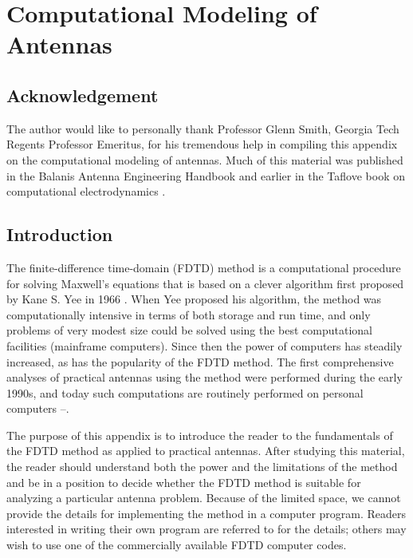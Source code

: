 \chapter{Computational Modeling of Antennas}

\section{Acknowledgement}
The author would like to personally thank Professor Glenn Smith, Georgia Tech Regents Professor Emeritus, for his tremendous help in compiling this appendix on the computational modeling of antennas.  Much of this material was published in the Balanis Antenna Engineering Handbook \cite{BalanisHB} and earlier in the Taflove book on computational electrodynamics \cite{MaloneySmithAntChapters}.

\section{Introduction}
The finite-difference time-domain (FDTD) method is a computational procedure for solving Maxwell's equations that is based on a clever algorithm first proposed by Kane S. Yee in 1966 \cite{Yee66}.  When Yee proposed his algorithm, the method was computationally intensive in terms of both storage and run time, and only problems of very modest size could be solved using the best computational facilities (mainframe computers).  Since then the power of computers has steadily increased, as has the popularity of the FDTD method.  The first comprehensive analyses of practical antennas using the method were performed during the early 1990s, and today such computations are routinely performed on personal computers \cite{Maloney1}--\cite{LuebbersGain}.

The purpose of this appendix is to introduce the reader to the fundamentals of the FDTD method as applied to practical antennas.  After studying this material, the reader should understand both the power and the limitations of the method and be in a position to decide whether the FDTD method is suitable for analyzing a particular antenna problem.  Because of the limited space, we cannot provide the details for implementing the method in a computer program.  Readers interested in writing their own program are referred to \cite{MaloneySmithAntChapters} for the details; others may wish to use one of the commercially available FDTD computer codes.

